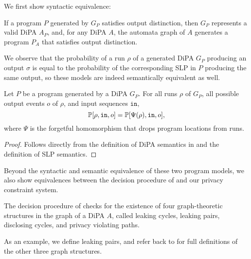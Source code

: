 We first show syntactic equivalence:

\begin{prop}\label{syntacticEquivalenceProp}
    If a program $P$ generated by $G_P$ satisfies output distinction, then $G_P$ represents a valid DiPA $A_P$, and, for any DiPA $A$, the automata graph of $A$ generates a program $P_A$ that satisfies output distinction. 
\end{prop}


We observe that the probability of a run $\rho$ of a generated DiPA $G_P$ producing an output $\sigma$ is equal to the probability of the corresponding SLP in $P$ producing the same output, so these models are indeed semantically equivalent as well.

\begin{prop}
    Let $P$ be a program generated by a DiPA $G_P$. For all runs $\rho$ of $G_P$, all possible output events $o$ of $\rho$, and input sequences $\texttt{in}$, \[
        \mathbb{P}[\rho, \texttt{in}, o]=\mathbb{P}[\Psi(\rho), \texttt{in}, o],
    \]
    where $\Psi$ is the forgetful homomorphism that drops program locations from runs. 
\end{prop}
\begin{proof}
    Follows directly from the definition of DiPA semantics in \cite{chadhaLinearTimeDecidability2021} and the definition of SLP semantics. 
\end{proof}

Beyond the syntactic and semantic equivalence of these two program models, we also show equivalences between the decision procedure of \cite{chadhaLinearTimeDecidability2021} and our privacy constraint system. 

The decision procedure of \cite{chadhaLinearTimeDecidability2021} checks for the existence of four graph-theoretic structures in the graph of a DiPA $A$, called leaking cycles, leaking pairs, disclosing cycles, and privacy violating paths. 

As an example, we define leaking pairs, and refer back to \cite{chadhaLinearTimeDecidability2021} for full definitions of the other three graph structures.

